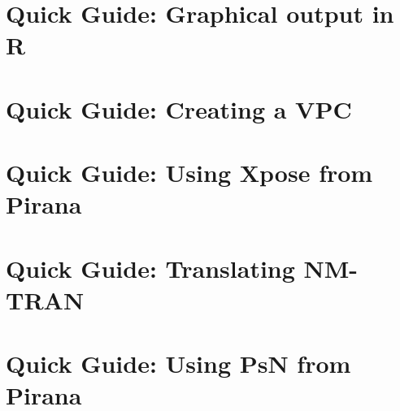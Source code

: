 \documentclass[9pt]{report}
\begin{document}
\clearpage
\section{Quick Guide: Graphical output in R}


\clearpage
\section{Quick Guide: Creating a VPC}


\clearpage
\section{Quick Guide: Using Xpose from Pirana }


\clearpage
\section{Quick Guide: Translating NM-TRAN }


\clearpage
\section{Quick Guide: Using PsN from Pirana}

\end{document}
